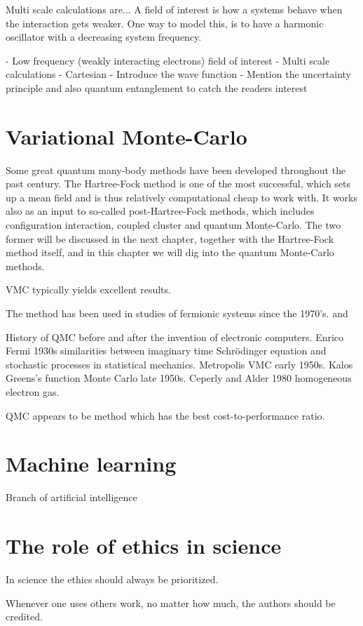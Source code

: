 Multi scale calculations are... A field of interest is how a systems behave when the interaction gets weaker. One way to model this, is to have a harmonic oscillator with a decreasing system frequency. 

- Low frequency (weakly interacting electrons) field of interest
- Multi scale calculations
- Cartesian
- Introduce the wave function
- Mention the uncertainty principle and also quantum entanglement to catch the readers interest

\section{Variational Monte-Carlo}
Some great quantum many-body methods have been developed throughout the past century. The Hartree-Fock method is one of the most successful, which sets up a mean field and is thus relatively computational cheap to work with. It works also as an input to so-called post-Hartree-Fock methods, which includes configuration interaction, coupled cluster and quantum Monte-Carlo. The two former will be discussed in the next chapter, together with the Hartree-Fock method itself, and in this chapter we will dig into the quantum Monte-Carlo methods. 

VMC typically yields excellent results.

The method has been used in studies of fermionic systems since the 1970's. \cite{deb_variational_2014} and 

History of QMC before and after the invention of electronic computers. Enrico Fermi 1930s similarities between imaginary time Schrödinger equation and stochastic processes in statistical mechanics. Metropolis VMC early 1950s. Kalos Greens's function Monte Carlo late 1950s. Ceperly and Alder 1980 homogeneous electron gas. 

QMC appears to be method which has the best cost-to-performance ratio.

\section{Machine learning} \label{subsec:machinelearning}
Branch of artificial intelligence

\section{The role of ethics in science}
In science the ethics should always be prioritized. 

Whenever one uses others work, no matter how much, the authors should be credited. 

